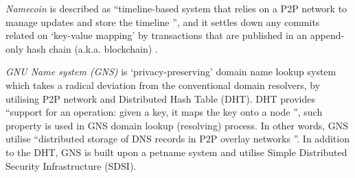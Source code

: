 \textit{Namecoin} \cite{loibl2014namecoin} is described as ``timeline-based system that relies on a P2P network to manage updates and store the timeline \cite{grothoff2017nsa}'', and it settles down any commits related on `key-value mapping' by transactions that are published in an append-only hash chain (a.k.a. blockchain) \cite{kalodner2015empirical}.

\textit{GNU Name system (GNS)} is `privacy-preserving' domain name lookup system which takes a radical deviation from the conventional domain resolvers, by utilising P2P network and Distributed Hash Table (DHT).
DHT provides ``support for an operation: given a key, it maps the key onto a node \cite{stoica2001chord}'', such property is used in GNS domain lookup (resolving) process. 
In other words, GNS utilise ``distributed storage of DNS records in P2P overlay networks \cite{wachs2014censorship}''. In addition to the DHT, GNS is built upon a petname system \cite{stiegler2005introduction} and utilise Simple Distributed Security Infrastructure (SDSI).